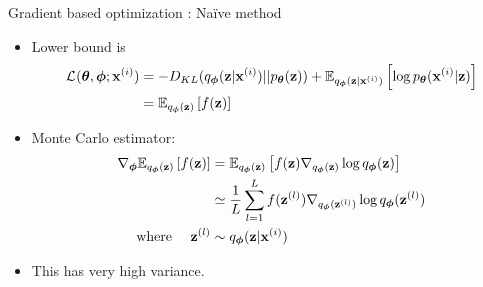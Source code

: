 \documentclass{beamer}
\begin{document}
\begin{frame}{Gradient based optimization : Na{\"i}ve method}
    \begin{itemize}
        \item{
            Lower bound is
            \begin{align*}
                \LB{}{\bxi} &= -D_{KL}(\qPhi(\bz|\bxi) || \pT(\bz)) + \Exp{\qPhi(\bz|\bxi)}{\log \pT(\bxi | \bz)} \\
                &= \Exp{\qPhi(\bz)}{f(\bz)}
            \end{align*}
        }
        \item {Monte Carlo estimator:
            \begin{align*}
                \nabla_{\bphi} \Exp{\qPhi(\bz)}{f(\bz)}
                &= \Exp{\qPhi(\bz)}{f(\bz) \nabla_{\qPhi(\bz)} \log \qPhi(\bz) } \\
                &\simeq \frac{1}{L} \sum_{l=1}^L f(\bzl) \nabla_{\qPhi(\bzl)} \log \qPhi(\bzl) \\
                 \text{\quad where \quad} \bzl &\sim \qPhi(\bz|\bxi)
            \end{align*}
        }
        \item {
            This has very high variance.
             \\
        }
    \end{itemize}

\end{frame}
\end{document}
